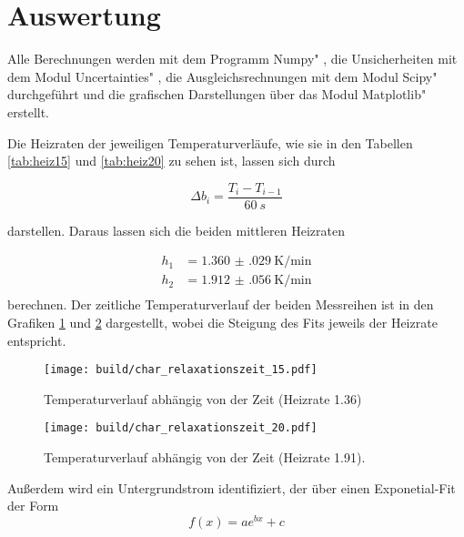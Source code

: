 \section{Auswertung}
\label{sec:Auswertung}
Alle Berechnungen werden mit dem Programm \glqq Numpy" \cite{numpy}, die Unsicherheiten mit dem Modul \glqq Uncertainties" \cite{uncertainties}, die Ausgleichsrechnungen mit dem Modul \glqq Scipy" \cite{scipy} durchgeführt und die grafischen Darstellungen über das Modul \glqq Matplotlib" \cite{matplotlib} erstellt.

Die Heizraten der jeweiligen Temperaturverläufe, wie sie in den Tabellen \ref{tab:heiz15} und \ref{tab:heiz20} zu sehen ist, lassen sich durch 

\begin{equation}
    \Delta b_i = \frac{T_i - T_{i-1}}{\SI{60}{s} }
\end{equation}

darstellen. Daraus lassen sich die beiden mittleren Heizraten 

\begin{align*}
    h_1 &=  \SI{1.360(029)}{\kelvin\per\minute}  \\
    h_2 &=  \SI{1.912(056)}{\kelvin\per\minute} \\
\end{align*}
berechnen. Der zeitliche Temperaturverlauf der beiden Messreihen ist in den Grafiken \ref{fig:h1} und \ref{fig:h2} dargestellt, wobei die Steigung des Fits 
jeweils der Heizrate entspricht. 

\begin{figure}
    \centering
    \texttt{[image: build/char\_relaxationszeit\_15.pdf]}
    \caption{Temperaturverlauf abhängig von der Zeit (Heizrate 1.36)}
    \label{fig:h1}
\end{figure}
\hfill
\begin{figure}
    \centering
    \texttt{[image: build/char\_relaxationszeit\_20.pdf]}
    \caption{Temperaturverlauf abhängig von der Zeit (Heizrate 1.91).}
    \label{fig:h2}
\end{figure}
\FloatBarrier

Außerdem wird ein Untergrundstrom identifiziert, der über einen Exponetial-Fit der Form 
\begin{equation}
    f(x) = a e^{bx} + c
\end{equation}

